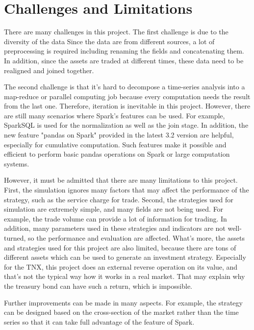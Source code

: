 \documentclass[a4paper]{article}
\begin{document}
\section{Challenges and Limitations}
There are many challenges in this project. The first challenge is due to the diversity of the data
Since the data are from different sources, a lot of preprocessing is required including renaming the fields and concatenating them. In addition, since the assets are traded at different times, these data need to be realigned and joined together.
\par The second challenge is that it's hard to decompose a time-series analysis into a map-reduce or parallel computing job because every computation needs the result from the last one. Therefore, iteration is inevitable in this project. However, there are still many scenarios where Spark's features can be used. For example, SparkSQL is used for the normalization as well as the join stage. In addition, the new feature "pandas on Spark" provided in the latest 3.2 version are helpful, especially for cumulative computation. Such features make it possible and efficient to perform basic pandas operations on Spark or large computation systems.
\par However, it must be admitted that there are many limitations to this project. First, the simulation ignores many factors that may affect the performance of the strategy, such as the service charge for trade. Second, the strategies used for simulation are extremely simple, and many fields are not being used. For example, the trade volume can provide a lot of information for trading. In addition, many parameters used in these strategies and indicators are not well-turned, so the performance and evaluation are affected. What's more, the assets and strategies used for this project are also limited, because there are tons of different assets which can be used to generate an investment strategy. Especially for the TNX, this project does an external reverse operation on its value, and that's not the typical way how it works in a real market. That may explain why the treasury bond can have such a return, which is impossible.
\par Further improvements can be made in many aspects. For example, the strategy can be designed based on the cross-section of the market rather than the time series so that it can take full advantage of the feature of Spark. 
\end{document}
